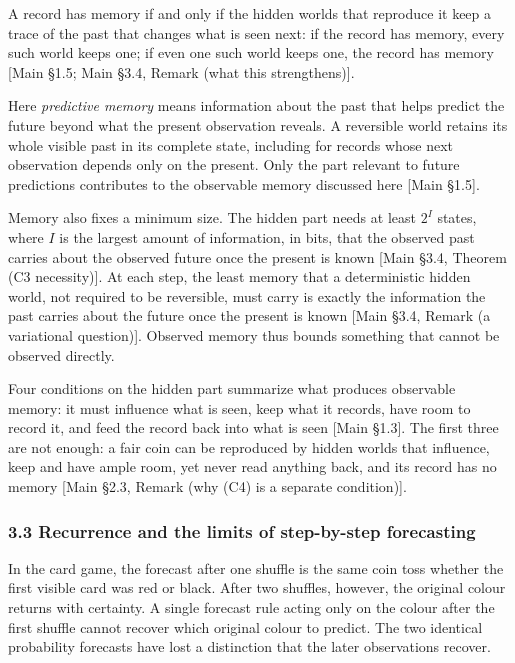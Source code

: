\documentclass[
]{article}
\begin{document}
A record has memory if and only if the hidden worlds that reproduce it
keep a trace of the past that changes what is seen next: if the record
has memory, every such world keeps one; if even one such world keeps
one, the record has memory {[}Main §1.5; Main §3.4, Remark (what this
strengthens){]}.

Here \emph{predictive memory} means information about the past that
helps predict the future beyond what the present observation reveals. A
reversible world retains its whole visible past in its complete state,
including for records whose next observation depends only on the
present. Only the part relevant to future predictions contributes to the
observable memory discussed here {[}Main §1.5{]}.

Memory also fixes a minimum size. The hidden part needs at least
\(2^{I}\) states, where \(I\) is the largest amount of information, in
bits, that the observed past carries about the observed future once the
present is known {[}Main §3.4, Theorem (C3 necessity){]}. At each step,
the least memory that a deterministic hidden world, not required to be
reversible, must carry is exactly the information the past carries about
the future once the present is known {[}Main §3.4, Remark (a variational
question){]}. Observed memory thus bounds something that cannot be
observed directly.

Four conditions on the hidden part summarize what produces observable
memory: it must influence what is seen, keep what it records, have room
to record it, and feed the record back into what is seen {[}Main
§1.3{]}. The first three are not enough: a fair coin can be reproduced
by hidden worlds that influence, keep and have ample room, yet never
read anything back, and its record has no memory {[}Main §2.3, Remark
(why (C4) is a separate condition){]}.

\hypertarget{recurrence-and-the-limits-of-step-by-step-forecasting}{%
\subsubsection{3.3 Recurrence and the limits of step-by-step
forecasting}\label{recurrence-and-the-limits-of-step-by-step-forecasting}}

In the card game, the forecast after one shuffle is the same coin toss
whether the first visible card was red or black. After two shuffles,
however, the original colour returns with certainty. A single forecast
rule acting only on the colour after the first shuffle cannot recover
which original colour to predict. The two identical probability
forecasts have lost a distinction that the later observations recover.
\end{document}
